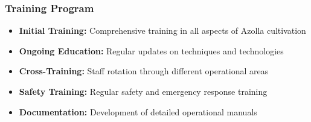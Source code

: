 \subsubsection{Training Program}
\begin{itemize}
    \item \textbf{Initial Training:} Comprehensive training in all aspects of Azolla cultivation
    \item \textbf{Ongoing Education:} Regular updates on techniques and technologies
    \item \textbf{Cross-Training:} Staff rotation through different operational areas
    \item \textbf{Safety Training:} Regular safety and emergency response training
    \item \textbf{Documentation:} Development of detailed operational manuals
\end{itemize}
